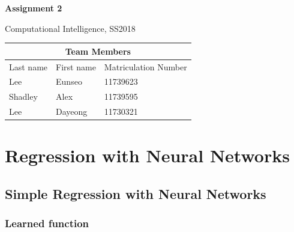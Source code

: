 \documentclass[a4paper]{article}
\begin{document}
\begin{titlepage}
  \centering
    {\huge \bf Assignment 2\par}
    \vspace{1cm}
    {\Large Computational Intelligence, SS2018\par}
    \vspace{1cm}
    \begin{tabular}{|l|l|l|}
      \hline
      \multicolumn{3}{|c|}{\textbf{Team Members}}   \\ \hline
      Last name & First name & Matriculation Number \\ \hline
      Lee       & Eunseo     & 11739623             \\ \hline
      Shadley   & Alex       & 11739595             \\ \hline
      Lee       & Dayeong    & 11730321             \\ \hline
    \end{tabular}
\end{titlepage}

\section{Regression with Neural Networks}
\subsection{Simple Regression with Neural Networks}
\subsubsection{Learned function}
\end{document}
